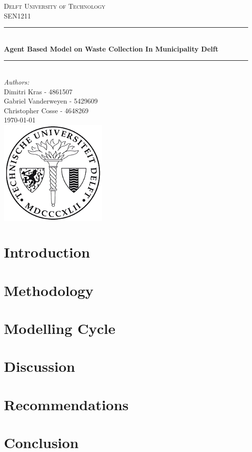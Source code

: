 \documentclass[a4paper]{article}
\begin{document}
\begin{titlepage}

\newcommand{\HRule}{\rule{\linewidth}{0.5mm}} 							%
\center 
 
\textsc{\LARGE Delft University of Technology}\\[1cm]

\textsc{\large SEN1211}\\[1cm] 										%
\HRule \\[0.8cm]
{ \huge \bfseries Agent Based Model on Waste Collection In Municipality Delft}\\[0.7cm]								%
\HRule \\[2cm]
\large
\emph{Authors:}\\[0.5cm]
Dimitri Kras - 4861507\\
Gabriel Vanderweyen - 5429609\\
Christopher Cosse - 4648269\\ [1.5cm]

{\large \today}\\[5cm]
\includegraphics[width=0.4\textwidth]{Images/TUDelftSeal.png}\\[1cm] 	%
\vfill 
\end{titlepage}

\newpage
\tableofcontents

\newpage
\section{Introduction}


\newpage
\section{Methodology}


\newpage
\section{Modelling Cycle}


\newpage
\section{Discussion}


\newpage
\section{Recommendations}



\section{Conclusion}


\newpage


\end{document}
